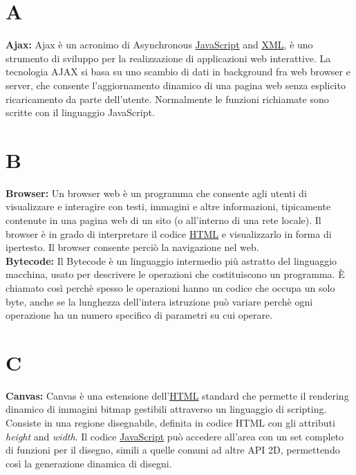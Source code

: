 \newpage

\section*{A}
\hypertarget{ajax}{}
\textbf{Ajax:}
Ajax \` e un acronimo di Asynchronous \hyperlink{javascript}{\underline{JavaScript}} and \hyperlink{xml}{\underline{XML}}, \` e uno strumento di sviluppo per la realizzazione di applicazioni web interattive. La tecnologia AJAX si basa su uno scambio di dati in background fra web browser e server, che consente l'aggiornamento dinamico di una pagina web senza esplicito ricaricamento da parte dell'utente. Normalmente le funzioni richiamate sono scritte con il linguaggio JavaScript.\\

\section*{B}
\hypertarget{browser}{}
\textbf{Browser:}
Un browser web \` e un programma che consente agli utenti di visualizzare e interagire con testi, immagini e altre informazioni, tipicamente contenute in una pagina web di un sito (o all'interno di una rete locale).
Il browser \` e in grado di interpretare il codice \hyperlink{html}{\underline{HTML}} e visualizzarlo in forma di ipertesto. Il browser consente perci\` o la navigazione nel web.\\

\hypertarget{bytecode}{}
\textbf{Bytecode:}
Il Bytecode \` e un linguaggio intermedio pi\` u astratto del linguaggio macchina, usato per descrivere le operazioni che costituiscono un programma. \` E chiamato cos\` i perch\` e spesso le operazioni hanno un codice che occupa un solo byte, anche se la lunghezza dell'intera istruzione pu\` o variare perch\` e ogni operazione ha un numero specifico di parametri su cui operare.\\

\section*{C}
\hypertarget{canvas}{}
\textbf{Canvas:}
Canvas \` e una estensione dell'\hyperlink{html}{\underline{HTML}} standard che permette il rendering dinamico di immagini bitmap gestibili attraverso un linguaggio di scripting.  Consiste in una regione disegnabile, definita in codice HTML con gli attributi \textit{height} and \textit{width}. Il codice \hyperlink{javascript}{\underline{JavaScript}} pu\`o accedere all'area con un set completo di funzioni per il disegno, simili a quelle comuni ad altre API 2D, permettendo cos\`i la generazione dinamica di disegni.\\

